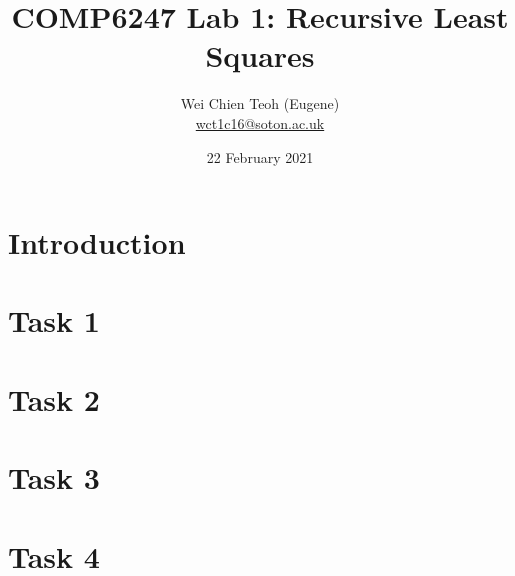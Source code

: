 \documentclass{article}
\title{COMP6247 Lab 1: Recursive Least Squares}
\author{Wei Chien Teoh (Eugene)\\\bigskip \href{mailto:wct1c16@soton.ac.uk}{wct1c16@soton.ac.uk}}
\date{22 February 2021}
\begin{document}
\maketitle

\section{Introduction}

\section{Task 1}

\section{Task 2}

\section{Task 3}

\section{Task 4}
\end{document}
